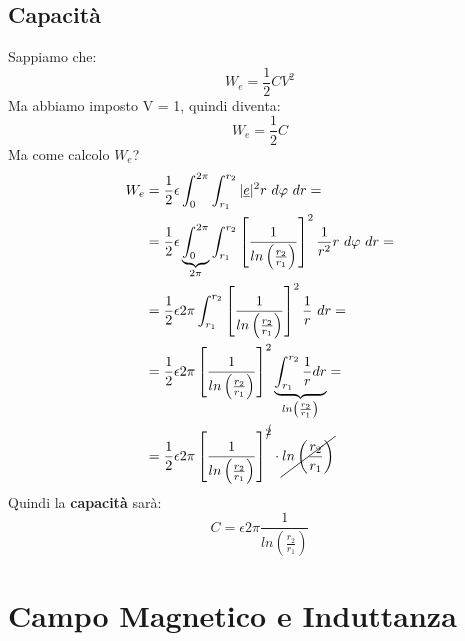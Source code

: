 \subsection{Capacità}
Sappiamo che:
\begin{equation*}
    W_e = \frac{1}{2}CV^2
\end{equation*}
Ma abbiamo imposto V = 1, quindi diventa:
\begin{equation*}
    W_e = \frac{1}{2}C
\end{equation*}
Ma come calcolo $W_e$?
\begin{equation*}
\begin{aligned}
    W_e &= \frac{1}{2}\epsilon \int_0^{2\pi} \int_{r_1}^{r_2}|\e|^2 r \ d\varphi \ dr = \\
    &= \frac{1}{2}\epsilon \underbrace{\int_0^{2\pi}}_{2\pi}  \int_{r_1}^{r_2} \left[\frac{1}{ln\left(\frac{r_2}{r_1}\right)}\right]^2 \frac{1}{r^2} r \ d\varphi \ dr = \\
    &= \frac{1}{2}\epsilon 2\pi  \int_{r_1}^{r_2} \left[\frac{1}{ln\left(\frac{r_2}{r_1}\right)}\right]^2 \frac{1}{r}\ dr=\\
    &= \frac{1}{2}\epsilon 2\pi \left[\frac{1}{ln\left(\frac{r_2}{r_1}\right)}\right]^2  \underbrace{\int_{r_1}^{r_2} \frac{1}{r} dr}_{ln\left(\frac{r_2}{r_1}\right)} =\\
    &= \frac{1}{2}\epsilon 2\pi \left[\frac{1}{ln\left(\frac{r_2}{r_1}\right)}\right]^{\cancel{2}} \cdot \cancel{ln\left(\frac{r_2}{r_1}\right)}
\end{aligned}
\end{equation*}
Quindi la \textbf{capacità} sarà:
\begin{equation*}
    C = \epsilon 2\pi \frac{1}{ln\left(\frac{r_2}{r_1}\right)}
\end{equation*}
\section{Campo Magnetico e Induttanza}
